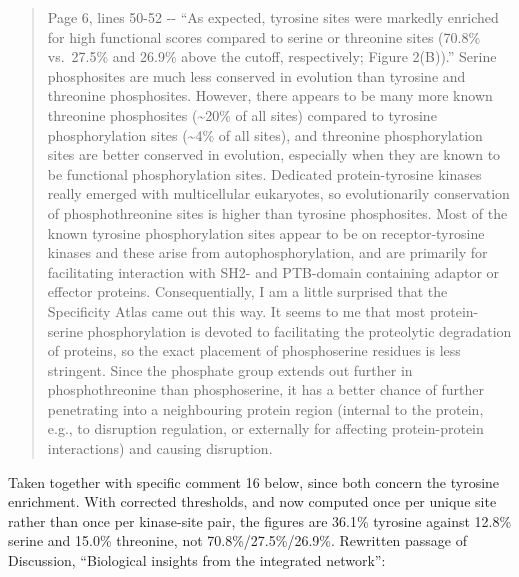 \documentclass[
]{article}
\begin{document}
\begin{quote}
Page 6, lines 50-52 -\/- ``As expected, tyrosine sites were markedly
enriched for high functional scores compared to serine or threonine
sites (70.8\% vs.~27.5\% and 26.9\% above the cutoff, respectively;
Figure 2(B)).'' Serine phosphosites are much less conserved in evolution
than tyrosine and threonine phosphosites. However, there appears to be
many more known threonine phosphosites (\textasciitilde20\% of all
sites) compared to tyrosine phosphorylation sites (\textasciitilde4\% of
all sites), and threonine phosphorylation sites are better conserved in
evolution, especially when they are known to be functional
phosphorylation sites. Dedicated protein-tyrosine kinases really emerged
with multicellular eukaryotes, so evolutionarily conservation of
phosphothreonine sites is higher than tyrosine phosphosites. Most of the
known tyrosine phosphorylation sites appear to be on receptor-tyrosine
kinases and these arise from autophosphorylation, and are primarily for
facilitating interaction with SH2- and PTB-domain containing adaptor or
effector proteins. Consequentially, I am a little surprised that the
Specificity Atlas came out this way. It seems to me that most
protein-serine phosphorylation is devoted to facilitating the
proteolytic degradation of proteins, so the exact placement of
phosphoserine residues is less stringent. Since the phosphate group
extends out further in phosphothreonine than phosphoserine, it has a
better chance of further penetrating into a neighbouring protein region
(internal to the protein, e.g., to disruption regulation, or externally
for affecting protein-protein interactions) and causing disruption.
\end{quote}

Taken together with specific comment 16 below, since both concern the
tyrosine enrichment. With corrected thresholds, and now computed once
per unique site rather than once per kinase-site pair, the figures are
36.1\% tyrosine against 12.8\% serine and 15.0\% threonine, not
70.8\%/27.5\%/26.9\%. Rewritten passage of Discussion, ``Biological
insights from the integrated network'':
\end{document}
